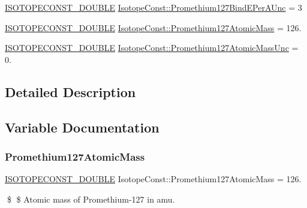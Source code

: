 \begin{DoxyCompactItemize}
\mbox{\hyperlink{group___isotope_const-_macros_ga8f45a7272ce02c0b4c65c44636ed719a}{I\+S\+O\+T\+O\+P\+E\+C\+O\+N\+S\+T\+\_\+\+D\+O\+U\+B\+LE}} \mbox{\hyperlink{group___isotope_const-_promethium-_pm127_gafae058c3db821e66f676c72f354ef3da}{Isotope\+Const\+::\+Promethium127\+Bind\+E\+Per\+A\+Unc}} = 3
\item 
\mbox{\hyperlink{group___isotope_const-_macros_ga8f45a7272ce02c0b4c65c44636ed719a}{I\+S\+O\+T\+O\+P\+E\+C\+O\+N\+S\+T\+\_\+\+D\+O\+U\+B\+LE}} \mbox{\hyperlink{group___isotope_const-_promethium-_pm127_ga26e9fae2ee005127a18abd397e7b964b}{Isotope\+Const\+::\+Promethium127\+Atomic\+Mass}} = 126.
\item 
\mbox{\hyperlink{group___isotope_const-_macros_ga8f45a7272ce02c0b4c65c44636ed719a}{I\+S\+O\+T\+O\+P\+E\+C\+O\+N\+S\+T\+\_\+\+D\+O\+U\+B\+LE}} \mbox{\hyperlink{group___isotope_const-_promethium-_pm127_ga01ddf486c65fdfd8e1de181f90181e71}{Isotope\+Const\+::\+Promethium127\+Atomic\+Mass\+Unc}} = 0.
\end{DoxyCompactItemize}


\subsection{Detailed Description}


\subsection{Variable Documentation}
\mbox{\label{group___isotope_const-_promethium-_pm127_ga26e9fae2ee005127a18abd397e7b964b}} 
\subsubsection{\texorpdfstring{Promethium127\+Atomic\+Mass}{Promethium127AtomicMass}}
{\footnotesize\ttfamily \mbox{\hyperlink{group___isotope_const-_macros_ga8f45a7272ce02c0b4c65c44636ed719a}{I\+S\+O\+T\+O\+P\+E\+C\+O\+N\+S\+T\+\_\+\+D\+O\+U\+B\+LE}} Isotope\+Const\+::\+Promethium127\+Atomic\+Mass = 126.}

\$ \$ Atomic mass of Promethium-\/127 in amu. \mbox{\label{group___isotope_const-_promethium-_pm127_ga01ddf486c65fdfd8e1de181f90181e71}} 
